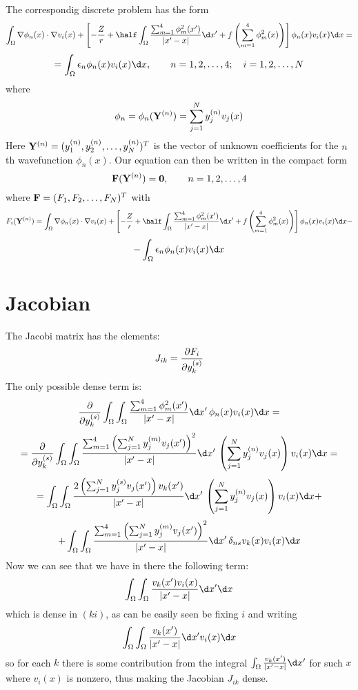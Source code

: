 \documentclass[11pt]{article}
\begin{document}
The correspondig discrete problem has the form
$$
\int_\Omega \nabla\phi_n(x)\cdot\nabla v_i(x)+\left[
-{Z\over r}+
\half \int_\Omega {
\sum_{m=1}^4 \phi_m^2(x')
\over|x' - x|}\d x'
+f\left( \sum_{m=1}^4\phi_m^2(x) \right)
\right]
\phi_n(x) v_i(x)  \d x=
$$
$$
=\int_\Omega
\epsilon_n\phi_n(x) v_i(x) \d x,\quad\quad n = 1, 2, \dots, 4;\quad
i = 1, 2, \dots, N
$$
where
$$\phi_n = \phi_n({\bf Y}^{(n)}) = \sum_{j=1}^N y_j^{(n)} v_j(x)$$
Here ${\bf Y}^{(n)} = (y_1^{(n)}, y_2^{(n)}, \dots, y_N^{(n)})^T$ is the vector
of unknown coefficients for the $n$th wavefunction $\phi_n(x)$. Our equation
can then be written in the compact form
$${\bf F}({\bf Y}^{(n)}) = {\bf 0},\quad\quad n = 1, 2, \dots, 4$$
where ${\bf F} = (F_1, F_2, \dots, F_N)^T$ with
$$F_i({\bf Y}^{(n)}) =
\int_\Omega \nabla\phi_n(x)\cdot\nabla v_i(x)+\left[
-{Z\over r}+
\half \int_\Omega {
\sum_{m=1}^4 \phi_m^2(x')
\over|x' - x|}\d x'
+f\left( \sum_{m=1}^4\phi_m^2(x) \right)
\right]
\phi_n(x) v_i(x)  \d x-
$$
$$
-\int_\Omega
\epsilon_n\phi_n(x) v_i(x) \d x
$$

\section{Jacobian}

The Jacobi matrix has the elements:
$$J_{ik} = {\partial F_i\over\partial y_k^{(s)}}$$
The only possible dense term is:
$$
{\partial\over\partial y_k^{(s)}}\int_\Omega \int_\Omega {
\sum_{m=1}^4 \phi_m^2(x')
\over|x' - x|}\d x'\,\phi_n(x) v_i(x) \d x =
$$
$$
=
{\partial\over\partial y_k^{(s)}}\int_\Omega \int_\Omega {
\sum_{m=1}^4 \left(\sum_{j=1}^N y_j^{(m)} v_j(x')\right)^2
\over|x' - x|}\d x'\, \left(\sum_{j=1}^N y_j^{(n)} v_j(x)\right)  v_i(x) \d x =
$$
$$
=
\int_\Omega \int_\Omega {
2 \left(\sum_{j=1}^N y_j^{(s)} v_j(x')\right)v_k(x')
\over|x' - x|}\d x'\, \left(\sum_{j=1}^N y_j^{(n)} v_j(x)\right)  v_i(x) \d x +
$$
$$+
\int_\Omega \int_\Omega {
\sum_{m=1}^4 \left(\sum_{j=1}^N y_j^{(m)} v_j(x')\right)^2
\over|x' - x|}\d x'\, \delta_{ns}v_k(x)  v_i(x) \d x
$$
Now we can see that we have in there the following term:
$$
\int_\Omega \int_\Omega {v_k(x') v_i(x)\over |x'-x|}\d x'\d x
$$
which is dense in $(ki)$, as can be easily seen be fixing $i$ and writing
$$
\int_\Omega \int_\Omega {v_k(x')\over |x'-x|}\d x' v_i(x)\d x
$$
so for each $k$ there is some contribution from the integral $ \int_\Omega
{v_k(x')\over |x'-x|}\d x' $ for such $x$ where $v_i(x)$ is nonzero, thus
making the Jacobian $J_{ik}$ dense.
\end{document}
